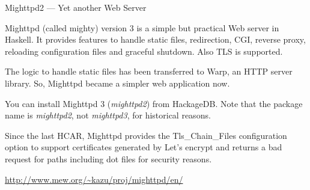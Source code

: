 \begin{hcarentry}[updated]{Mighttpd2 --- Yet another Web Server}
\label{mighttpd2}
\makeheader

Mighttpd (called mighty) version 3 is a simple but practical Web server in
Haskell. It provides features to handle static files, redirection, CGI,
reverse proxy, reloading configuration files and graceful shutdown. Also TLS
is supported.

The logic to handle static files has been transferred to Warp, an HTTP server
library. So, Mighttpd became a simpler web application now.

You can install Mighttpd 3 ({\it mighttpd2}) from HackageDB. Note that the
package name is {\it mighttpd2}, not {\it mighttpd3}, for historical reasons.

Since the last HCAR, Mighttpd provides the Tls\_Chain\_Files configuration option to support certificates generated by Let's encrypt and returns a bad request for paths including dot files for security reasons.

\FurtherReading
\begin{compactitem}
\item \url{http://www.mew.org/~kazu/proj/mighttpd/en/}
\end{compactitem}
\end{hcarentry}
